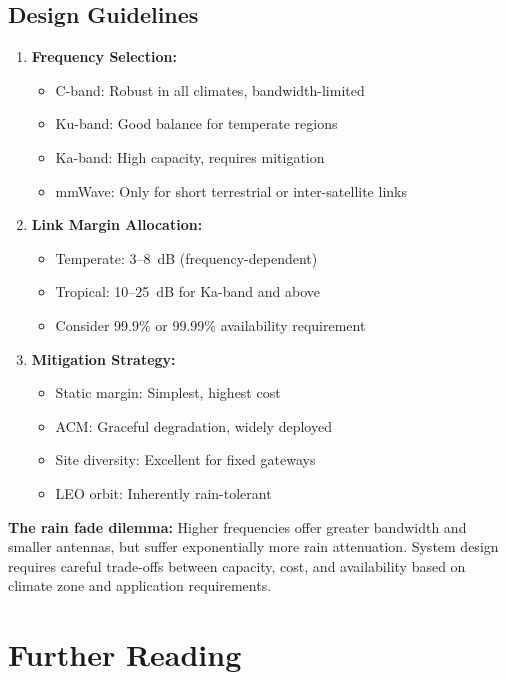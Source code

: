 \subsection{Design Guidelines}

\begin{enumerate}
\item \textbf{Frequency Selection:}
  \begin{itemize}
  \item C-band: Robust in all climates, bandwidth-limited
  \item Ku-band: Good balance for temperate regions
  \item Ka-band: High capacity, requires mitigation
  \item mmWave: Only for short terrestrial or inter-satellite links
  \end{itemize}

\item \textbf{Link Margin Allocation:}
  \begin{itemize}
  \item Temperate: 3--8~dB (frequency-dependent)
  \item Tropical: 10--25~dB for Ka-band and above
  \item Consider 99.9\% or 99.99\% availability requirement
  \end{itemize}

\item \textbf{Mitigation Strategy:}
  \begin{itemize}
  \item Static margin: Simplest, highest cost
  \item ACM: Graceful degradation, widely deployed
  \item Site diversity: Excellent for fixed gateways
  \item LEO orbit: Inherently rain-tolerant
  \end{itemize}
\end{enumerate}

\begin{keyconcept}
\textbf{The rain fade dilemma:} Higher frequencies offer greater bandwidth and smaller antennas, but suffer exponentially more rain attenuation. System design requires careful trade-offs between capacity, cost, and availability based on climate zone and application requirements.
\end{keyconcept}

\section{Further Reading}


